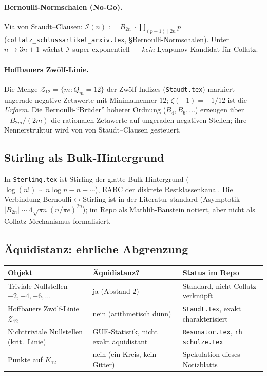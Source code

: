 \documentclass[11pt,a4paper]{article}
\theoremstyle{definition}
\theoremstyle{remark}
\begin{document}
\paragraph{Bernoulli-Normschalen (No-Go).}
Via von Staudt--Clausen:
$\mathcal{I}(n):=|B_{2n}|\cdot\prod_{(p-1)\mid 2n}p$
(\texttt{collatz\_schlussartikel\_arxiv.tex}, §Bernoulli-Normschalen).
Unter $n\mapsto 3n+1$ wächst $\mathcal{I}$ super-exponentiell ---
\emph{kein} Lyapunov-Kandidat für Collatz.

\paragraph{Hoffbauers Zwölf-Linie.}
Die Menge $\mathcal{Z}_{12}=\{m:Q_m=12\}$ der Zwölf-Indizes
(\texttt{Staudt.tex}) markiert ungerade negative Zetawerte mit
Minimalnenner $12$; $\zeta(-1)=-1/12$ ist die \emph{Urform}.
Die Bernoulli-``Brüder'' höherer Ordnung ($B_4,B_6,\ldots$) erzeugen
über $-B_{2m}/(2m)$ die rationalen Zetawerte auf ungeraden negativen
Stellen; ihre Nennerstruktur wird von von Staudt--Clausen gesteuert.

\subsection{Stirling als Bulk-Hintergrund}

In \texttt{Sterling.tex} ist Stirling der glatte Bulk-Hintergrund
($\log(n!)\sim n\log n-n+\cdots$), EABC der diskrete Restklassenkanal.
Die Verbindung Bernoulli$\leftrightarrow$Stirling ist in der
Literatur standard (Asymptotik $|B_{2n}|\sim 4\sqrt{\pi n}
(n/\pi e)^{2n}$); im Repo als Mathlib-Baustein notiert, aber nicht
als Collatz-Mechanismus formalisiert.

\subsection{Äquidistanz: ehrliche Abgrenzung}

\begin{center}
  \begin{tabular}{@{}lll@{}}
    \toprule
    Objekt & Äquidistanz? & Status im Repo \\
    \midrule
    Triviale Nullstellen $-2,-4,-6,\ldots$ & ja (Abstand $2$) & Standard, nicht Collatz-verknüpft \\
    Hoffbauers Zwölf-Linie $\mathcal{Z}_{12}$ & nein (arithmetisch dünn) & \texttt{Staudt.tex}, exakt charakterisiert \\
    Nichttriviale Nullstellen (krit.\ Linie) & GUE-Statistik, nicht exakt äquidistant & \texttt{Resonator.tex}, \texttt{rh scholze.tex} \\
    Punkte auf $K_{12}$ & nein (ein Kreis, kein Gitter) & Spekulation dieses Notizblatts \\
    \bottomrule
  \end{tabular}
\end{center}
\end{document}
